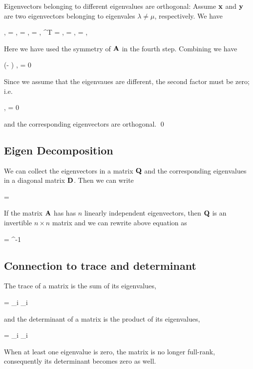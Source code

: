 Eigenvectors belonging to different eigenvalues are orthogonal: Assume $\mathbf{x}$ and $\mathbf{y}$ are two eigenvectors belonging to eigenvales $\lambda \neq \mu$, respectively. We have

\bee
\lambda \langle \xbf, \ybf \rangle = \langle \lambda \xbf, \ybf \rangle = \langle \Abf \xbf, \ybf \rangle = \langle \xbf , \Abf^T \ybf \rangle = \langle\xbf, \Abf\ybf\rangle = \langle\xbf, \mu \ybf\rangle = \mu \langle\xbf, \ybf\rangle
\eee

Here we have used the symmetry of $\mathbf{A}$ in the fourth step. Combining we have

\bee
(\lambda - \mu) \langle\xbf, \ybf \rangle = 0
\eee

Since we assume that the eigenvaues are different, the second factor must be zero; i.e.

\bee
\langle\xbf, \ybf\rangle = 0
\eee

and the corresponding eigenvectors are orthogonal. \qed


\subsection{Eigen Decomposition}

We can collect the eigenvectors in a matrix $\mathbf{Q}$ and the corresponding eigenvalues in a diagonal matrix $\mathbf{D}$. Then we can write

\bee
\Abf \Qbf = \Dbf \Qbf
\eee

If the matrix $\mathbf{A}$ has has $n$ linearly independent eigenvectors, then $\mathbf{Q}$ is an invertible $n \times n$ matrix and we can rewrite above equation as

\bee
\Abf = \Qbf \Dbf \Qbf^{-1}
\eee


\subsection{Connection to trace and determinant}

The trace of a matrix is the sum of its eigenvalues,

\bee
{} \Abf = \sum_i \lambda_i
\eee

and the determinant of a matrix is the product of its eigenvalues,

\bee
\det \Abf = \prod_i \lambda_i
\eee

When at least one eigenvalue is zero, the matrix is no longer full-rank, consequently its determinant becomes zero as well.



